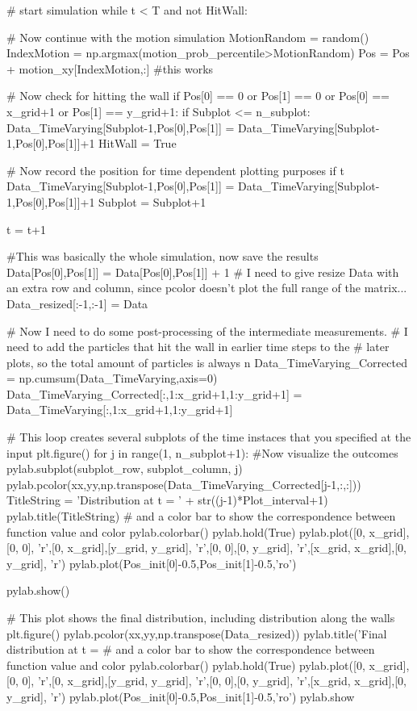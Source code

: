 \begin{python}
    # start simulation
    while t < T and not HitWall:
                
         # Now continue with the motion simulation
        MotionRandom = random()
        IndexMotion = np.argmax(motion_prob_percentile>MotionRandom)
        Pos = Pos + motion_xy[IndexMotion,:] #this works
        
        # Now check for hitting the wall
        if Pos[0] == 0 or Pos[1] == 0 or Pos[0] == x_grid+1 or Pos[1] == y_grid+1:
            if Subplot <= n_subplot:             
                Data_TimeVarying[Subplot-1,Pos[0],Pos[1]] = Data_TimeVarying[Subplot-1,Pos[0],Pos[1]]+1
            HitWall = True

        # Now record the position for time dependent plotting purposes
        if t %
            Data_TimeVarying[Subplot-1,Pos[0],Pos[1]] = Data_TimeVarying[Subplot-1,Pos[0],Pos[1]]+1
            Subplot = Subplot+1        
        
        t = t+1
    
    
    #This was basically the whole simulation, now save the results
    Data[Pos[0],Pos[1]] = Data[Pos[0],Pos[1]] + 1
    # I need to give resize Data with an extra row and column, since pcolor doesn't plot the full range of the matrix...
    Data_resized[:-1,:-1] = Data       


# Now I need to do some post-processing of the intermediate measurements.
# I need to add the particles that hit the wall in earlier time steps to the 
# later plots, so the total amount of particles is always n  
Data_TimeVarying_Corrected = np.cumsum(Data_TimeVarying,axis=0)
Data_TimeVarying_Corrected[:,1:x_grid+1,1:y_grid+1] = Data_TimeVarying[:,1:x_grid+1,1:y_grid+1]


# This loop creates several subplots of the time instaces that you specified at the input
plt.figure()
for j in range(1, n_subplot+1):
    #Now visualize the outcomes
    pylab.subplot(subplot_row, subplot_column, j)
    pylab.pcolor(xx,yy,np.transpose(Data_TimeVarying_Corrected[j-1,:,:]))
    TitleString = 'Distribution at t = ' + str((j-1)*Plot_interval+1)
    pylab.title(TitleString)
    # and a color bar to show the correspondence between function value and color
    pylab.colorbar()
    pylab.hold(True)
    pylab.plot([0, x_grid],[0, 0], 'r',[0, x_grid],[y_grid, y_grid], 'r',[0, 0],[0, y_grid], 'r',[x_grid, x_grid],[0, y_grid], 'r')
    pylab.plot(Pos_init[0]-0.5,Pos_init[1]-0.5,'ro')

pylab.show()

# This plot shows the final distribution, including distribution along the walls
plt.figure()
pylab.pcolor(xx,yy,np.transpose(Data_resized))
pylab.title('Final distribution at t = %
# and a color bar to show the correspondence between function value and color
pylab.colorbar()
pylab.hold(True)
pylab.plot([0, x_grid],[0, 0], 'r',[0, x_grid],[y_grid, y_grid], 'r',[0, 0],[0, y_grid], 'r',[x_grid, x_grid],[0, y_grid], 'r')
pylab.plot(Pos_init[0]-0.5,Pos_init[1]-0.5,'ro')
pylab.show
\end{python}



